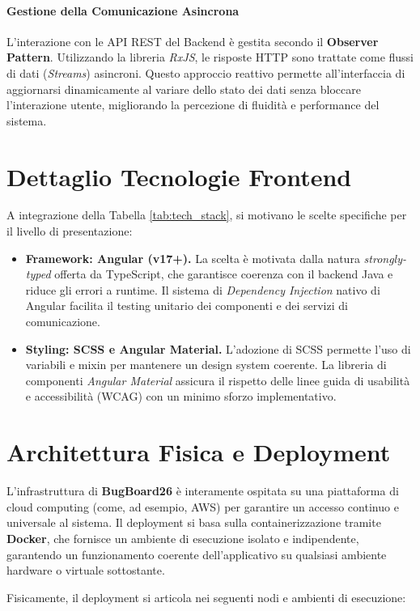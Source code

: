 \paragraph{Gestione della Comunicazione Asincrona}
L'interazione con le API REST del Backend è gestita secondo il \textbf{Observer Pattern}. Utilizzando la libreria \textit{RxJS}, le risposte HTTP sono trattate come flussi di dati (\textit{Streams}) asincroni. Questo approccio reattivo permette all'interfaccia di aggiornarsi dinamicamente al variare dello stato dei dati senza bloccare l'interazione utente, migliorando la percezione di fluidità e performance del sistema.

\section{Dettaglio Tecnologie Frontend}
A integrazione della Tabella \ref{tab:tech_stack}, si motivano le scelte specifiche per il livello di presentazione:

\begin{itemize}
    \item \textbf{Framework: Angular (v17+).} La scelta è motivata dalla natura \textit{strongly-typed} offerta da TypeScript, che garantisce coerenza con il backend Java e riduce gli errori a runtime. Il sistema di \textit{Dependency Injection} nativo di Angular facilita il testing unitario dei componenti e dei servizi di comunicazione.
    \item \textbf{Styling: SCSS e Angular Material.} L'adozione di SCSS permette l'uso di variabili e mixin per mantenere un design system coerente. La libreria di componenti \textit{Angular Material} assicura il rispetto delle linee guida di usabilità e accessibilità (WCAG) con un minimo sforzo implementativo.
\end{itemize}

\section{Architettura Fisica e Deployment}
L'infrastruttura di \textbf{BugBoard26} è interamente ospitata su una piattaforma di cloud computing (come, ad esempio, AWS) per garantire un accesso continuo e universale al sistema. Il deployment si basa sulla containerizzazione tramite \textbf{Docker}, che fornisce un ambiente di esecuzione isolato e indipendente, garantendo un funzionamento coerente dell'applicativo su qualsiasi ambiente hardware o virtuale sottostante.

Fisicamente, il deployment si articola nei seguenti nodi e ambienti di esecuzione:

